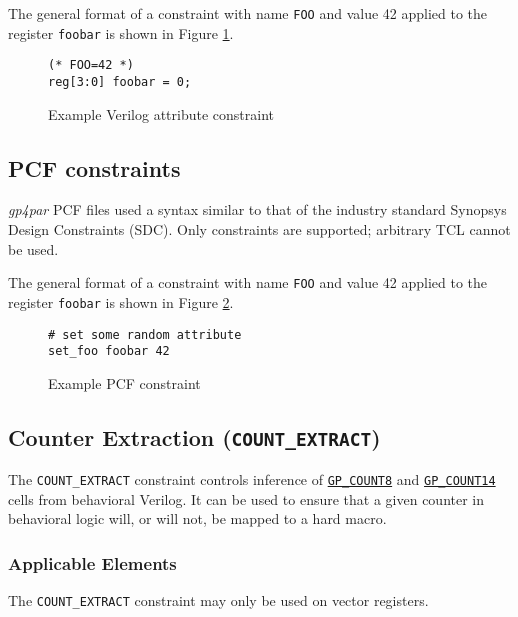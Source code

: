 \documentclass[11pt]{article}
\newcommand{\namestyle}[1]{\textit{#1}}
\newcommand{\tokenstyle}[1]{\texttt{#1}}
\newcommand{\wirestyle}[1]{\texttt{#1}}
\newcommand{\tokenref}[2]{\hyperref[#2]{\tokenstyle{#1}}}
\begin{document}
The general format of a constraint with name \tokenstyle{FOO} and value 42 applied to the register \wirestyle{foobar}
is shown in Figure \ref{constraint-verilog}.

\begin{figure}[h]
\begin{lstlisting}
(* FOO=42 *)
reg[3:0] foobar = 0;
\end{lstlisting}
\caption{Example Verilog attribute constraint}
\label{constraint-verilog}
\end{figure}

\subsection{PCF constraints}

\namestyle{gp4par} PCF files used a syntax similar to that of the industry standard Synopsys Design Constraints (SDC).
Only constraints are supported; arbitrary TCL cannot be used.

The general format of a constraint with name \tokenstyle{FOO} and value 42 applied to the register \wirestyle{foobar}
is shown in Figure \ref{constraint-pcf}.

\begin{figure}[h]
\begin{lstlisting}
# set some random attribute
set_foo foobar 42
\end{lstlisting}
\caption{Example PCF constraint}
\label{constraint-pcf}
\end{figure}


\pagebreak
\subsection{Counter Extraction (\tokenstyle{COUNT\_EXTRACT})}
\label{count-extract}

The \tokenstyle{COUNT\_EXTRACT} constraint controls inference of \tokenref{GP\_COUNT8}{gp-count8} and \tokenref{GP\_COUNT14}{gp-count14} cells from behavioral Verilog. It can be
used to ensure that a given counter in behavioral logic will, or will not, be mapped to a hard macro.

\subsubsection{Applicable Elements}
The \tokenstyle{COUNT\_EXTRACT} constraint may only be used on vector registers.
\end{document}
